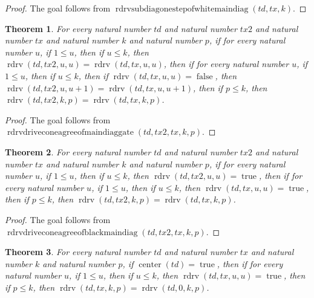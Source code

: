 \documentclass[11pt]{article}
\newtheorem{theorem}{Theorem}[section]
\theoremstyle{definition}
\begin{document}
\begin{proof}
The goal follows from \(\operatorname{rdrvsubdiagonestepofwhitemaindiag}(td, tx, k)\).
\end{proof}
\begin{theorem}
\label{ll:paper:rdrv-drive-cone-agree-of-main-diag-gate}
For every natural number \(td\) and natural number \(tx2\) and natural number \(tx\) and natural number \(k\) and natural number \(p\), if for every natural number \(u\), if \(1 \le u\), then if \(u \le k\), then \(\operatorname{rdrv}(td, tx2, u, u) = \operatorname{rdrv}(td, tx, u, u)\), then if for every natural number \(u\), if \(1 \le u\), then if \(u \le k\), then if \(\operatorname{rdrv}(td, tx, u, u) = \operatorname{false}\), then \(\operatorname{rdrv}(td, tx2, u, u + 1) = \operatorname{rdrv}(td, tx, u, u + 1)\), then if \(p \le k\), then \(\operatorname{rdrv}(td, tx2, k, p) = \operatorname{rdrv}(td, tx, k, p)\).
\end{theorem}
\begin{proof}
The goal follows from \(\operatorname{rdrvdriveconeagreeofmaindiaggate}(td, tx2, tx, k, p)\).
\end{proof}
\begin{theorem}
\label{ll:paper:rdrv-drive-cone-agree-of-black-main-diag}
For every natural number \(td\) and natural number \(tx2\) and natural number \(tx\) and natural number \(k\) and natural number \(p\), if for every natural number \(u\), if \(1 \le u\), then if \(u \le k\), then \(\operatorname{rdrv}(td, tx2, u, u) = \operatorname{true}\), then if for every natural number \(u\), if \(1 \le u\), then if \(u \le k\), then \(\operatorname{rdrv}(td, tx, u, u) = \operatorname{true}\), then if \(p \le k\), then \(\operatorname{rdrv}(td, tx2, k, p) = \operatorname{rdrv}(td, tx, k, p)\).
\end{theorem}
\begin{proof}
The goal follows from \(\operatorname{rdrvdriveconeagreeofblackmaindiag}(td, tx2, tx, k, p)\).
\end{proof}
\begin{theorem}
\label{ll:paper:rdrv-drive-cone-eq-white-seed-of-black-main-diag}
For every natural number \(td\) and natural number \(tx\) and natural number \(k\) and natural number \(p\), if \(\operatorname{center}(td) = \operatorname{true}\), then if for every natural number \(u\), if \(1 \le u\), then if \(u \le k\), then \(\operatorname{rdrv}(td, tx, u, u) = \operatorname{true}\), then if \(p \le k\), then \(\operatorname{rdrv}(td, tx, k, p) = \operatorname{rdrv}(td, 0, k, p)\).
\end{theorem}
\end{document}
